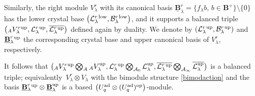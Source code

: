 \documentclass[10pt,a4paper]{amsart}
\numberwithin{equation}{section}
\theoremstyle{definition}
\newcommand{\Ll}{{\mathcal L}}
\begin{document}
Similarly, the right module $V_\lambda^r$ with its canonical basis $\underline{\mathbf{B}}_\lambda^r{}=\{f_\lambda b,\, b\in \mathbf{B}^+\}\setminus \{0\}$ has the lower crystal base $\big(\Ll_{\lambda}^r{}^{\rm low},\mathcal{B}_\lambda^r{}^{\rm low}\big)$, and it supports a balanced triple $\big({}_AV_\lambda^r{}^{\rm up},\Ll_{\lambda} ^r{}^{\rm up},\overline{\Ll_{\lambda} ^r{}^{\rm up}}\big)$ defined again by duality. We denote by $(\Ll_{\lambda}^r{}^{\rm up},\mathcal{B}_\lambda^r{}^{\rm up})$ and $\underline{\mathbf{B}}_\lambda^r{}^{\rm up}$ the corresponding crystal base and upper canonical basis of $V_\lambda^r$, respectively.

It follows that $\big({}_AV_\lambda^r{}^{\rm up}\bigotimes_A {}_AV_\lambda^{\rm up},\Ll_{\lambda}^r{}^{\rm up} \bigotimes_{\mathcal{A}_0}\Ll_{\lambda}^{\rm up},\overline{\Ll_{\lambda}^r{}^{\rm up}}\bigotimes_{\mathcal{A}_\infty}\overline{\Ll_{\lambda}^{\rm up}}\big)$ is a balanced triple; equivalently~${V_\lambda^r \otimes V_\lambda}$ with the bimodule structure \eqref{bimodaction} and the basis $\underline{\mathbf{B}}_\lambda^r{}^{\rm up}\otimes \underline{\mathbf{B}}_\lambda^{\rm up}$ is a based $\big(U_q^{\rm ad} \otimes (U_q^{\rm ad})^{\rm op}\big)$-module.
\end{document}

